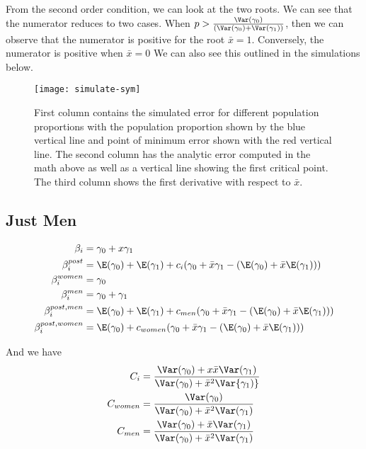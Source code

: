 From the second order condition, we can look at the two roots. We can see that the numerator reduces to two cases. When $p > \frac{\Var(\gamma_0)}{(\Var(\gamma_0) + \Var(\gamma_1))}$, then we can observe that the numerator is positive for the root $\bar{x} = 1$. Conversely, the numerator is positive when  $\bar{x} = 0$
We can also see this outlined in the simulations below.
\begin{figure}[ht!]
  \centering
	\texttt{[image: simulate-sym]}
	\caption{First column contains the simulated error for different population proportions with the population proportion shown by the blue vertical line and point of minimum error shown with the red vertical line. The second column has the analytic error computed in the math above as well as a vertical line showing the first critical point. The third column shows the first derivative with respect to $\bar{x}$.} 
\end{figure}


\subsection*{Just Men}

\begin{align*}
	\beta_i &= \gamma_0 + x \gamma_1 \\
	\beta_{i}^{post} &= \E(\gamma_0) + \E(\gamma_1)  + c_i ( \gamma_0 + \bar{x} \gamma_1 - (\E(\gamma_0) + \bar{x} \E(\gamma_1))) \\
	\beta_i^{women} &= \gamma_0 \\
	\beta_i^{men} &= \gamma_0 + \gamma_1 \\
	\beta_i^{post,men} &= \E(\gamma_0) + \E(\gamma_1)  + c_{men} ( \gamma_0 + \bar{x} \gamma_1 - (\E(\gamma_0) + \bar{x} \E(\gamma_1))) \\
	\beta_i^{post, women} &= \E(\gamma_0) +  c_{women} ( \gamma_0 + \bar{x} \gamma_1 - (\E(\gamma_0) + \bar{x} \E(\gamma_1))) \\
\end{align*} 

And we have
\begin{align*}
	C_i &= \frac{\Var(\gamma_0) + x \bar{x} \Var(\gamma_1)}{\Var(\gamma_0) + \bar{x}^2 \Var{\gamma_1)}} \\
	C_{women} &= \frac{\Var(\gamma_0)}{\Var(\gamma_0) + \bar{x}^2 \Var(\gamma_1)} \\
	C_{men} &= \frac{\Var(\gamma_0) + \bar{x} \Var(\gamma_1)}{\Var(\gamma_0) + \bar{x}^2 \Var(\gamma_1)}
\end{align*} 


